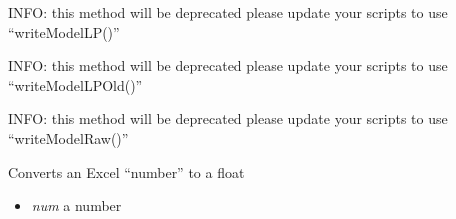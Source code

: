 \documentclass[a4paper,11pt,english]{sphinxmanual}
\begin{document}

\begin{fulllineitems}
\label{modules_doc:cbmpy.CBWrite.WriteModelLP}
INFO: this method will be deprecated please update your scripts to use ``writeModelLP()''

\end{fulllineitems}


\begin{fulllineitems}
\label{modules_doc:cbmpy.CBWrite.WriteModelLPOld}
INFO: this method will be deprecated please update your scripts to use ``writeModelLPOld()''

\end{fulllineitems}


\begin{fulllineitems}
\label{modules_doc:cbmpy.CBWrite.WriteModelRaw}
INFO: this method will be deprecated please update your scripts to use ``writeModelRaw()''

\end{fulllineitems}


\begin{fulllineitems}
\label{modules_doc:cbmpy.CBWrite.convertExcelToFloat}
Converts an Excel ``number'' to a float
\begin{itemize}
\item {} 
\emph{num} a number

\end{itemize}

\end{fulllineitems}
\end{document}
